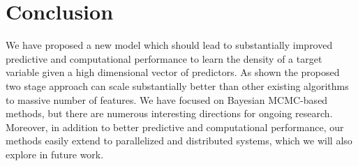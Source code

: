 \documentclass{article} %
\begin{document}
\section{Conclusion}
We have proposed a new model which should lead to substantially improved predictive and computational performance to learn the density of a target variable given a high dimensional vector of predictors. As shown the proposed two stage approach can scale substantially better than other existing algorithms to massive number of features. We have focused on Bayesian MCMC-based methods, but there are numerous interesting directions for ongoing research. Moreover, in addition to better predictive and computational performance, our methods easily extend to parallelized and distributed systems, which we will also explore in future work.


 
 
\end{document}
